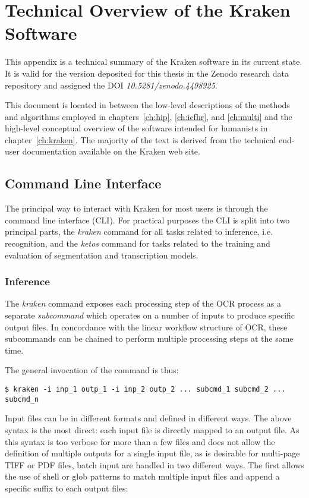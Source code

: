 \chapter{Technical Overview of the Kraken Software}
\label{app:kraken}

This appendix is a technical summary of the Kraken software in its current
state. It is valid for the version deposited for this thesis in the Zenodo
research data repository and assigned the DOI \emph{10.5281/zenodo.4498925}.

This document is located in between the low-level descriptions of the methods
and algorithms employed in chapters~\ref{ch:hip}, \ref{ch:icfhr}, and
\ref{ch:multi} and the high-level conceptual overview of the software intended
for humanists in chapter~\ref{ch:kraken}. The majority of the text is derived
from the technical end-user documentation available on the Kraken web site.

\section{Command Line Interface}

The principal way to interact with Kraken for most users is through the command
line interface (CLI). For practical purposes the CLI is split into two
principal parts, the \emph{kraken} command for all tasks related to inference, i.e.
recognition, and the \emph{ketos} command for tasks related to the training
and evaluation of segmentation and transcription models.

\subsection{Inference}

The \emph{kraken} command exposes each processing step of the OCR process as
a separate \emph{subcommand} which operates on a number of inputs to produce
specific output files. In concordance with the linear workflow structure of
OCR, these subcommands can be chained to perform multiple processing steps at
the same time.

The general invocation of the command is thus:

\begin{verbatim}
$ kraken -i inp_1 outp_1 -i inp_2 outp_2 ... subcmd_1 subcmd_2 ... subcmd_n
\end{verbatim}

Input files can be in different formats and defined in different ways. The
above syntax is the most direct: each input file is directly mapped to an
output file. As this syntax is too verbose for more than a few files and does
not allow the definition of multiple outputs for a single input file, as is
desirable for multi-page TIFF or PDF files, batch input are handled in two
different ways. The first allows the use of shell or glob patterns to match
multiple input files and append a specific suffix to each output files:

